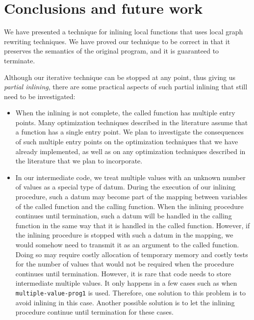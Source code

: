 \section{Conclusions and future work}
\label{sec-conclusions}

We have presented a technique for inlining local functions that uses
local graph rewriting techniques.  We have proved our technique to be
correct in that it preserves the semantics of the original program,
and it is guaranteed to terminate.

Although our iterative technique can be stopped at any point, thus
giving us \emph{partial inlining}, there are some practical aspects of
such partial inlining that still need to be investigated:

\begin{itemize}
\item When the inlining is not complete, the called function has
  multiple entry points.  Many optimization techniques described in
  the literature assume that a function has a single entry point.  We
  plan to investigate the consequences of such multiple entry points
  on the optimization techniques that we have already implemented, as
  well as on any optimization techniques described in the literature
  that we plan to incorporate.
\item In our intermediate code, we treat multiple values with an
  unknown number of values as a special type of datum.  During the
  execution of our inlining procedure, such a datum may become part of
  the mapping between variables of the called function and the calling
  function.  When the inlining procedure continues until termination,
  such a datum will be handled in the calling function in the same way
  that it is handled in the called function.  However, if the inlining
  procedure is stopped with such a datum in the mapping, we would
  somehow need to transmit it as an argument to the called function.
  Doing so may require costly allocation of temporary memory and
  costly tests for the number of values that would not be required
  when the procedure continues until termination.  However, it is rare
  that code needs to store intermediate multiple values.  It only
  happens in a few cases such as when \texttt{multiple-value-prog1} is
  used.  Therefore, one solution to this problem is to avoid inlining
  in this case.  Another possible solution is to let the inlining
  procedure continue until termination for these cases.
\end{itemize}
